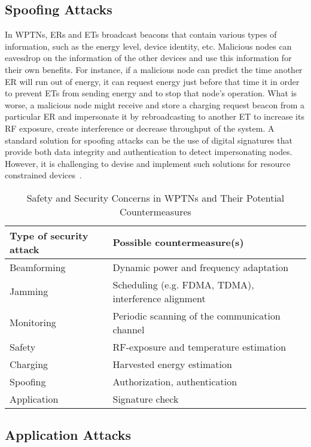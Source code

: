 \documentclass[journal,10pt,draftclsnofoot,onecolumn]{IEEEtran}
\begin{document}
\subsection{Spoofing Attacks}

In WPTNs, ERs and ETs broadcast beacons that contain various types of information, such as the energy level, device identity, etc. Malicious nodes can eavesdrop on the information of the other devices and use this information for their own benefits. For instance, if a malicious node can predict the time another ER will run out of energy, it can request energy just before that time it in order to prevent ETs from sending energy and to stop that node's operation. What is worse, a malicious node might receive and store a charging request beacon from a particular ER and impersonate it by rebroadcasting to another ET to increase its RF exposure, create interference or decrease throughput of the system. A standard solution for spoofing attacks can be the use of digital signatures that provide both data integrity and authentication to detect impersonating nodes. However, it is challenging to devise and implement such solutions for resource constrained devices~\cite{trappe2015lowenergysecurity}.

\begin{table*}
	\centering
	\caption{\label{tab:layers}Safety and Security Concerns in WPTNs and Their Potential Countermeasures}
	\begin{tabular}{|l|l|}
		\hline 
		\textbf{Type of security attack } & \textbf{Possible countermeasure(s)} \\ \hline\hline 
		Beamforming & Dynamic power and frequency adaptation\\ \hline 
		Jamming & Scheduling (e.g. FDMA, TDMA), interference alignment \\ \hline 
		Monitoring & Periodic scanning of the communication channel \\ \hline 
		Safety & RF-exposure and temperature estimation\\ \hline
		Charging & Harvested energy estimation\\ \hline
		Spoofing & Authorization, authentication\\ \hline
		Application & Signature check\\ \hline 
	\end{tabular}
\end{table*} 

\subsection{Application Attacks}
\end{document}

